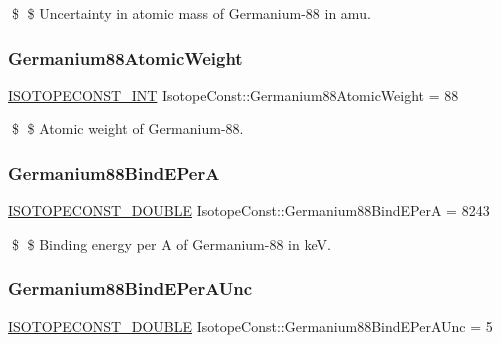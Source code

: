 \$ \$ Uncertainty in atomic mass of Germanium-\/88 in amu. \mbox{\label{group___isotope_const-_germanium-_ge88_ga5166c2b3694e1dfc4cfc98211d985df3}} 
\subsubsection{\texorpdfstring{Germanium88\+Atomic\+Weight}{Germanium88AtomicWeight}}
{\footnotesize\ttfamily \mbox{\hyperlink{group___isotope_const-_macros_ga5f18360b3e99483a35c32d789e62621c}{I\+S\+O\+T\+O\+P\+E\+C\+O\+N\+S\+T\+\_\+\+I\+NT}} Isotope\+Const\+::\+Germanium88\+Atomic\+Weight = 88}

\$ \$ Atomic weight of Germanium-\/88. \mbox{\label{group___isotope_const-_germanium-_ge88_ga94aa4a10b76e2289dca6f7ca13d81d14}} 
\subsubsection{\texorpdfstring{Germanium88\+Bind\+E\+PerA}{Germanium88BindEPerA}}
{\footnotesize\ttfamily \mbox{\hyperlink{group___isotope_const-_macros_ga8f45a7272ce02c0b4c65c44636ed719a}{I\+S\+O\+T\+O\+P\+E\+C\+O\+N\+S\+T\+\_\+\+D\+O\+U\+B\+LE}} Isotope\+Const\+::\+Germanium88\+Bind\+E\+PerA = 8243}

\$ \$ Binding energy per A of Germanium-\/88 in keV. \mbox{\label{group___isotope_const-_germanium-_ge88_ga51010c13a03a2fb4d2557e2249fff6d0}} 
\subsubsection{\texorpdfstring{Germanium88\+Bind\+E\+Per\+A\+Unc}{Germanium88BindEPerAUnc}}
{\footnotesize\ttfamily \mbox{\hyperlink{group___isotope_const-_macros_ga8f45a7272ce02c0b4c65c44636ed719a}{I\+S\+O\+T\+O\+P\+E\+C\+O\+N\+S\+T\+\_\+\+D\+O\+U\+B\+LE}} Isotope\+Const\+::\+Germanium88\+Bind\+E\+Per\+A\+Unc = 5}

